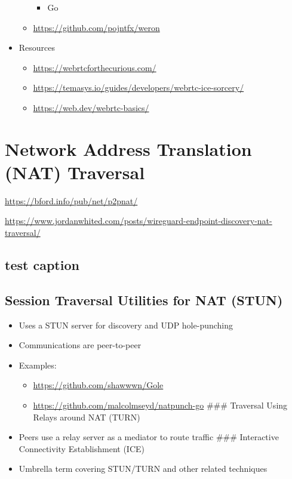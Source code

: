 \begin{itemize}
\begin{itemize}
    \begin{itemize}
    \tightlist
    \item
      Go
    \end{itemize}
  \item
    \url{https://github.com/pojntfx/weron}
  \end{itemize}
\item
  Resources

  \begin{itemize}
  \tightlist
  \item
    \url{https://webrtcforthecurious.com/}
  \item
    \url{https://temasys.io/guides/developers/webrtc-ice-sorcery/}
  \item
    \href{https://web.dev/webrtc-basics/\#toc-rtcpeerconnection}{https://web.dev/webrtc-basics/}
  \end{itemize}
\end{itemize}

\hypertarget{network-address-translation-nat-traversal}{%
\section{Network Address Translation (NAT)
Traversal}\label{network-address-translation-nat-traversal}}

\url{https://bford.info/pub/net/p2pnat/}

\url{https://www.jordanwhited.com/posts/wireguard-endpoint-discovery-nat-traversal/}

\hypertarget{test}{%
\subsection{test caption}\label{test}}

\hypertarget{session-traversal-utilities-for-nat-stun}{%
\subsection{Session Traversal Utilities for NAT
(STUN)}\label{session-traversal-utilities-for-nat-stun}}

\begin{itemize}
\tightlist
\item
  Uses a STUN server for discovery and UDP hole-punching
\item
  Communications are peer-to-peer
\item
  Examples:

  \begin{itemize}
  \tightlist
  \item
    \url{https://github.com/shawwwn/Gole}
  \item
    \url{https://github.com/malcolmseyd/natpunch-go} \#\#\# Traversal
    Using Relays around NAT (TURN)
  \end{itemize}
\item
  Peers use a relay server as a mediator to route traffic \#\#\#
  Interactive Connectivity Establishment (ICE)
\item
  Umbrella term covering STUN/TURN and other related techniques
\end{itemize}

